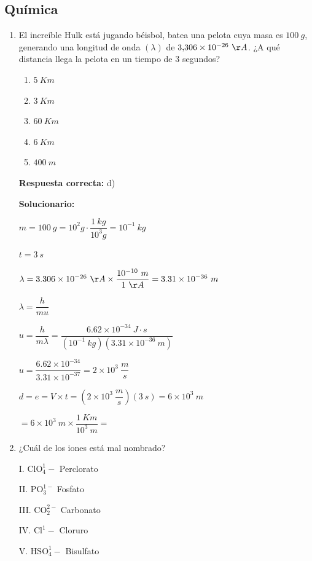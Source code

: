\subsection*{Química}

\begin{enumerate}[resume]
	
	\item El increíble Hulk está jugando béisbol, batea una pelota cuya masa es $100\ g$, generando una longitud de onda $(\lambda)$ de $3{,}306\times10^{-26}\ \AA$. ¿A qué distancia llega la pelota en un tiempo de $3$ segundos?
	\begin{enumerate}[label=\alph*)]
		\item $5\ Km$
		\item $3\ Km$
		\item $60\ Km$
		\item $6\ Km$
		\item $400\ m$
	\end{enumerate}
	\textbf{Respuesta correcta:} d)
	
	\vspace{2mm}
	\textbf{Solucionario:}
	
	$m=100\ g=10^2g\cdot\dfrac{1\ kg}{10^3g}=10^{-1}\ kg$
	
	$t=3\ s$
	
	$\lambda=3{.}306\times10^{-26}\ \AA\times\dfrac{10^{-10}\ m}{1\ \AA}=3{.}31\times10^{-36}\ m$
	
	$\lambda=\dfrac{h}{mu}$
	
	$u=\dfrac{h}{m\lambda}=\dfrac{6{.}62\times10^{-34}\ J\cdot s}{(10^{-1}\ kg)(3{.}31\times10^{-36}\ m)}$
	
	$u=\dfrac{6{.}62\times10^{-34}}{3{.}31\times10^{-37}}=2\times10^3\ \dfrac{m}{s}$
	
	$d=e=V\times t=(2\times10^3\ \dfrac{m}{s})(3\ s)=6\times10^3\ m$
	
	$=6\times10^3\ m\times\dfrac{1\ Km}{10^3\ m}=$
	
	\vspace{6mm}
	
	\item ¿Cuál de los iones está mal nombrado?
	
	I. $\mathrm{ClO_4^1-}$ Perclorato
	
	II. $\mathrm{PO_3^{1-}}$ Fosfato
	
	III. $\mathrm{CO_2^{2-}}$ Carbonato
	
	IV. $\mathrm{Cl^1-}$ Cloruro
	
	V. $\mathrm{HSO_4^1-}$ Bisulfato
	

\end{enumerate}
